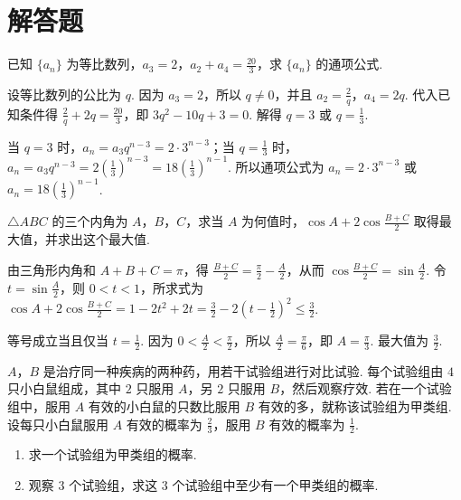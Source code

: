 \section{解答题}
\begin{problem}
已知 \(\{a_{n}\}\) 为等比数列，\(a_{3} = 2\)，\(a_{2} + a_{4} = \frac{20}{3}\)，求 \(\{a_{n}\}\) 的通项公式.
\end{problem}

\begin{solution}
设等比数列的公比为 \(q\). 因为 \(a_{3}=2\)，所以 \(q\neq0\)，并且 \(a_{2}=\frac{2}{q}\)，\(a_{4}=2q\). 代入已知条件得
\(\frac{2}{q}+2q=\frac{20}{3}\)，即 \(3q^{2}-10q+3=0\). 解得 \(q=3\) 或 \(q=\frac{1}{3}\).

当 \(q=3\) 时，\(a_{n}=a_{3}q^{n-3}=2\cdot3^{n-3}\)；当 \(q=\frac{1}{3}\) 时，\(a_{n}=a_{3}q^{n-3}=2\left(\frac{1}{3}\right)^{n-3}=18\left(\frac{1}{3}\right)^{n-1}\). 所以通项公式为 \(a_n=2\cdot3^{n-3}\) 或 \(a_n=18\left(\frac{1}{3}\right)^{n-1}\).
\end{solution}

\begin{problem}
\(\triangle ABC\) 的三个内角为 \(A\)，\(B\)，\(C\)，求当 \(A\) 为何值时，\(\cos A + 2\cos \frac{B + C}{2}\) 取得最大值，并求出这个最大值.
\end{problem}

\begin{solution}
由三角形内角和 \(A+B+C=\pi\)，得 \(\frac{B+C}{2}=\frac{\pi}{2}-\frac{A}{2}\)，从而 \(\cos\frac{B+C}{2}=\sin\frac{A}{2}\). 令 \(t=\sin\frac{A}{2}\)，则 \(0<t<1\)，所求式为
\(\cos A+2\cos\frac{B+C}{2}=1-2t^{2}+2t=\frac{3}{2}-2\left(t-\frac{1}{2}\right)^{2}\leqslant\frac{3}{2}\).

等号成立当且仅当 \(t=\frac{1}{2}\). 因为 \(0<\frac{A}{2}<\frac{\pi}{2}\)，所以 \(\frac{A}{2}=\frac{\pi}{6}\)，即 \(A=\frac{\pi}{3}\). 最大值为 \(\frac{3}{2}\).
\end{solution}

\begin{problem}
\(A\)，\(B\) 是治疗同一种疾病的两种药，用若干试验组进行对比试验. 每个试验组由 \(4\) 只小白鼠组成，其中 \(2\) 只服用 \(A\)，另 \(2\) 只服用 \(B\)，然后观察疗效. 若在一个试验组中，服用 \(A\) 有效的小白鼠的只数比服用 \(B\) 有效的多，就称该试验组为甲类组. 设每只小白鼠服用 \(A\) 有效的概率为 \(\frac{2}{3}\)，服用 \(B\) 有效的概率为 \(\frac{1}{2}\).

\begin{enumerate}
\item 求一个试验组为甲类组的概率.
\item 观察 \(3\) 个试验组，求这 \(3\) 个试验组中至少有一个甲类组的概率.
\end{enumerate}
\end{problem}

